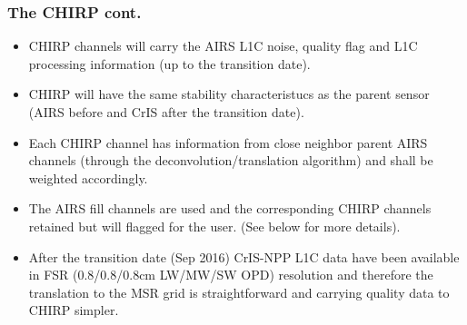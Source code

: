 \documentclass[10pt,t]{beamer}
\begin{document}
\begin{frame}
  \frametitle{The CHIRP cont.}
  \begin{itemize}
  \item CHIRP channels will carry the AIRS L1C noise, quality flag and L1C processing information (up to the transition date).
    \item CHIRP will have the same stability characteristucs as the parent sensor (AIRS before and CrIS after the transition date).
  \item Each CHIRP channel has information from close neighbor parent AIRS channels (through the deconvolution/translation algorithm) and shall be weighted accordingly.
  \item The AIRS fill channels are used and the corresponding CHIRP channels retained  but will flagged for the user. (See below for more details).
  \item After the transition date (Sep 2016) CrIS-NPP L1C data have been available in FSR (0.8/0.8/0.8cm LW/MW/SW OPD) resolution and therefore the translation to the MSR grid is straightforward and carrying quality data to CHIRP simpler.
  \end{itemize}
\end{frame}

\end{document}
